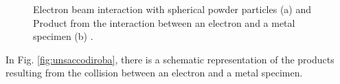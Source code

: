 \begin{figure}
    \centering
    \qquad
    \caption[Laser interactions and laser intensity.]{Electron beam interaction with spherical powder particles (a) and Product from the interaction between an electron and a metal specimen (b) \cite{tushar_ramkrishna_mahale_electron_2009, krumeich_properties_nodate}.}
\end{figure}
In Fig. \ref{fig:unsaccodiroba}, there is a schematic representation of the products resulting from the collision between an electron and a metal specimen.

